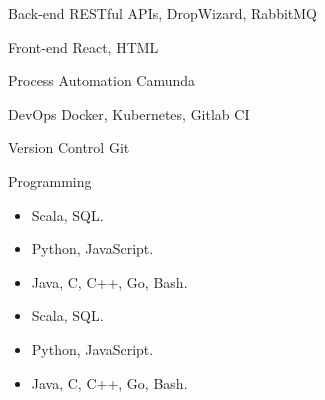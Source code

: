

\begin{cvskills}

  \cvskill
    {Back-end} %
    {RESTful APIs, DropWizard, RabbitMQ} %

  \cvskill
      {Front-end} %
      {React, HTML} %

  \cvskill
    {Process Automation}
    {Camunda}

  \cvskill
    {DevOps} %
    {Docker, Kubernetes, Gitlab CI} %

  \cvskill
  {Version Control} %
  {Git} %

  \cvskill
    {Programming} %
    { 
      \begin{itemize}
        \item {} Scala, SQL.
        \item {} Python, JavaScript. 
        \item {} Java, C, C++, Go, Bash.
      \end{itemize}
    } 
  \cvskill
    {} %
    { 
      \begin{itemize}
        \item {} Scala, SQL.
        \item {} Python, JavaScript. 
        \item {} Java, C, C++, Go, Bash.
      \end{itemize}
    } 
\end{cvskills}
